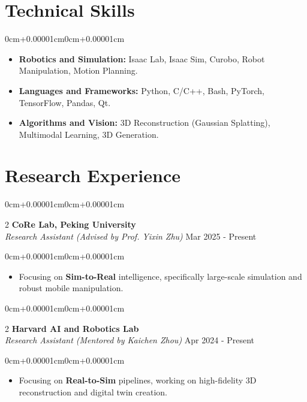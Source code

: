 \documentclass[10pt, letterpaper]{article}
\newenvironment{highlights}{\begin{itemize}[topsep=0.10cm,parsep=0.10cm,partopsep=0pt,itemsep=0pt,leftmargin=0cm+10pt]}{\end{itemize}}
\newenvironment{onecolentry}{\begin{adjustwidth}{0cm+0.00001cm}{0cm+0.00001cm}}{\end{adjustwidth}}
\newenvironment{twocolentry}[2][]{\onecolentry\def\secondColumn{#2}\setcolumnwidth{\fill, 4.5cm}\begin{paracol}{2}}{\switchcolumn \raggedleft \secondColumn\end{paracol}\endonecolentry}
\begin{document}
    \section{Technical Skills}
    \begin{onecolentry}
        \begin{highlights}
            \item \textbf{Robotics and Simulation:} Isaac Lab, Isaac Sim, Curobo, Robot Manipulation, Motion Planning.
            \item \textbf{Languages and Frameworks:} Python, C/C++, Bash, PyTorch, TensorFlow, Pandas, Qt.
            \item \textbf{Algorithms and Vision:} 3D Reconstruction (Gaussian Splatting), Multimodal Learning, 3D Generation.
        \end{highlights}
    \end{onecolentry}

    \section{Research Experience}

    \begin{twocolentry}{Mar 2025 - Present}
        \textbf{CoRe Lab, Peking University} \\
        \textit{Research Assistant (Advised by Prof. Yixin Zhu)}
    \end{twocolentry}
    \vspace{0.10cm}
    \begin{onecolentry}
        \begin{highlights}
            \item Focusing on \textbf{Sim-to-Real} intelligence, specifically large-scale simulation and robust mobile manipulation.
        \end{highlights}
    \end{onecolentry}

    \vspace{0.2cm}

    \begin{twocolentry}{Apr 2024 - Present}
        \textbf{Harvard AI and Robotics Lab} \\
        \textit{Research Assistant (Mentored by Kaichen Zhou)}
    \end{twocolentry}
    \vspace{0.10cm}
    \begin{onecolentry}
        \begin{highlights}
            \item Focusing on \textbf{Real-to-Sim} pipelines, working on high-fidelity 3D reconstruction and digital twin creation.
        \end{highlights}
    \end{onecolentry}
\end{document}
